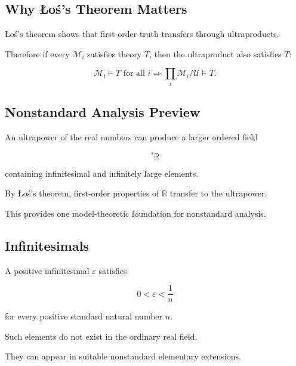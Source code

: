 \subsection{Why Łoś's Theorem Matters}
\label{subsec:why-los-theorem}

Łoś's theorem shows that first-order truth transfers through
ultraproducts.

Therefore if every \(\mathcal{M}_i\) satisfies theory \(T\), then the
ultraproduct also satisfies \(T\):

\[
\boxed{
\mathcal{M}_i\models T
\text{ for all }i
\Longrightarrow
\prod_i\mathcal{M}_i/\mathcal{U}
\models T.
}
\]

\subsection{Nonstandard Analysis Preview}
\label{subsec:nonstandard-analysis-preview-model-theory}

An ultrapower of the real numbers can produce a larger ordered field

\[
\boxed{
{}^*\mathbb{R}
}
\]

containing infinitesimal and infinitely large elements.

By Łoś's theorem, first-order properties of \(\mathbb{R}\) transfer to the
ultrapower.

This provides one model-theoretic foundation for nonstandard analysis.

\subsection{Infinitesimals}
\label{subsec:model-theoretic-infinitesimals}

A positive infinitesimal \(\varepsilon\) satisfies

\[
\boxed{
0<\varepsilon<\frac1n
}
\]

for every positive standard natural number \(n\).

Such elements do not exist in the ordinary real field.

They can appear in suitable nonstandard elementary extensions.

